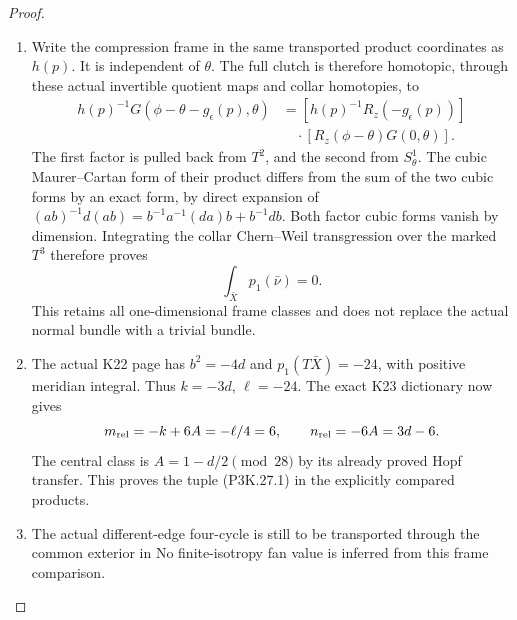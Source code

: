 \begin{proof}
\begin{enumerate}[label=\arabic*.]
\item Write the compression frame in the same transported product
coordinates as \(h(p)\). It is independent of \(\theta\).
The full clutch is therefore homotopic, through these actual
invertible quotient maps and collar homotopies, to
\[
\begin{aligned}
 h(p)^{-1}G(\phi-\theta-g_\epsilon(p),\theta)
   &=[h(p)^{-1}R_z(-g_\epsilon(p))]\\
   &\quad\cdot[R_z(\phi-\theta)G(0,\theta)].
\end{aligned}
\]
The first factor is pulled back from \(T^2\), and the second
from \(S^1_\theta\). The cubic Maurer--Cartan form of their
product differs from the sum of the two cubic forms by an
exact form, by direct expansion of
\((ab)^{-1}d(ab)=b^{-1}a^{-1}(da)b+b^{-1}db\).
Both factor cubic forms vanish by dimension. Integrating
the collar Chern--Weil transgression over the marked \(T^3\)
therefore proves
\[
                     \int_{\bar X}p_1(\bar\nu)=0.
\]
This retains all one-dimensional frame classes and does not
replace the actual normal bundle with a trivial bundle.

\item The actual K22 page has
\(b^2=-4d\) and \(p_1(T\bar X)=-24\), with positive
meridian integral. Thus \(k=-3d\), \(\ell=-24\).
The exact K23 dictionary now gives
\[
      m_{\rm rel}=-k+6A=-\ell/4=6,\qquad
      n_{\rm rel}=-6A=3d-6.
\]
The central class is \(A=1-d/2\pmod{28}\) by its
already proved Hopf transfer. This proves the
tuple (P3K.27.1) in the explicitly compared products.

\item The actual different-edge four-cycle is still to be
transported through the common exterior in
 No finite-isotropy
fan value is inferred from this frame comparison.

\end{enumerate}
\end{proof}